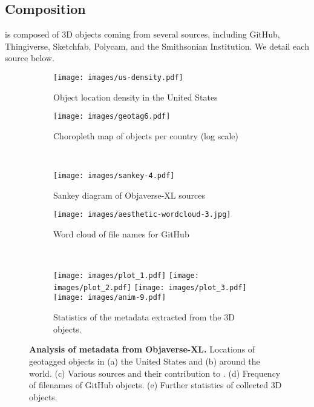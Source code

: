 \subsection{Composition}

\dataset is composed of 3D objects coming from several sources, including GitHub, Thingiverse, Sketchfab, Polycam, and the Smithsonian Institution. We detail each source below.

\begin{figure}
    \begin{subfigure}{0.43\textwidth}
        \centering
        \texttt{[image: images/us-density.pdf]}
        \caption{Object location density in the United States} %
        \label{fig:usdensity} %
    \end{subfigure}
    \hfill
    \begin{subfigure}{0.575\textwidth}
        \centering
        \texttt{[image: images/geotag6.pdf]}
        \caption{Choropleth map of objects per country (log scale)} %
        \label{fig:geotag5} %
    \end{subfigure}
    \\[0.10in]
    \begin{subfigure}{0.43\textwidth}
        \centering
        \texttt{[image: images/sankey-4.pdf]}
        \caption{Sankey diagram of Objaverse-XL sources} %
        \label{fig:geotag5} %
    \end{subfigure}
    \hfill
    \begin{subfigure}{0.575\textwidth}
        \centering
        \texttt{[image: images/aesthetic-wordcloud-3.jpg]}
        \caption{Word cloud of file names for GitHub} %
    \end{subfigure}
    \\[0.10in]
    \begin{subfigure}{\textwidth}
        \texttt{[image: images/plot\_1.pdf]}%
        \hfill%
        \texttt{[image: images/plot\_2.pdf]}%
        \hfill%
        \texttt{[image: images/plot\_3.pdf]}%
        \hfill%
        \texttt{[image: images/anim-9.pdf]}
        \caption{Statistics of the metadata extracted from the 3D objects.}
        \label{fig:statMeta}
    \end{subfigure}
    \caption{\textbf{Analysis of metadata from Objaverse-XL.} Locations of geotagged objects in (a) the United States and (b) around the world. (c) Various sources and their contribution to \dataset. (d) Frequency of filenames of GitHub objects. (e) Further statistics of collected 3D objects.}
    \label{fig:stats} %
\end{figure}

